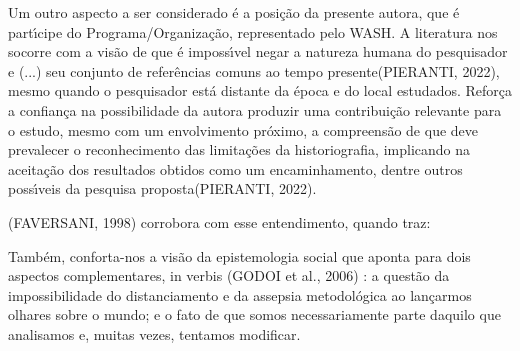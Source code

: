 \documentclass[
12pt,		%
openright,	%
twoside,  %
a4paper,			%
chapter=TITLE,		%
english,			%
french,				%
spanish,			%
brazil				%
]{USPSC-classe/USPSC}
\begin{document}
Um outro aspecto a ser considerado \'e a posi\c{c}\~ao da presente autora, que \'e part\'{\i}cipe do Programa/Organiza\c{c}\~ao, representado pelo WASH. A literatura nos socorre com a vis\~ao de que \'e imposs\'{\i}vel \textquotedbl negar a natureza humana do pesquisador e (...) seu conjunto de refer\^encias comuns ao tempo presente\textquotedbl  (PIERANTI, 2022), mesmo quando o pesquisador est\'a \textquotedbl distante da \'epoca e do local estudados\textquotedbl . Refor\c{c}a a confian\c{c}a na possibilidade da autora produzir uma contribui\c{c}\~ao relevante para o  estudo, mesmo com um envolvimento pr\'oximo, a compreens\~ao de que \textquotedbl deve prevalecer o reconhecimento das limita\c{c}\~oes da historiografia, implicando na aceita\c{c}\~ao dos resultados obtidos como um encaminhamento, dentre outros poss\'{\i}veis da pesquisa proposta\textquotedbl  (PIERANTI, 2022).

















(FAVERSANI, 1998) corrobora com esse entendimento, quando traz:


















\noindent\begin{center}\mbox{\centering{}}\end{center}


Tamb\'em, conforta-nos a vis\~ao da epistemologia social que aponta para dois aspectos complementares, in verbis (GODOI et al., 2006) : \textquotedbl a quest\~ao da impossibilidade do distanciamento e da assepsia metodol\'ogica ao lan\c{c}armos olhares sobre o mundo; e o fato de que somos necessariamente parte daquilo que analisamos e, muitas vezes, tentamos modificar\textquotedbl .
\end{document}
